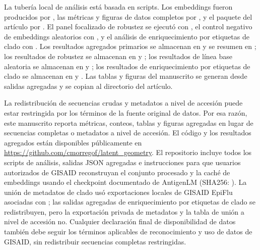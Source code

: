 \documentclass[11pt]{article}
\begin{document}
La tubería local de análisis está basada en scripts. Los embeddings fueron producidos por , las métricas y figuras de datos completos por , y el paquete del artículo por . El panel focalizado de robustez se ejecutó con , el control negativo de embeddings aleatorios con , y el análisis de enriquecimiento por etiquetas de clado con . Los resultados agregados primarios se almacenan en  y se resumen en ; los resultados de robustez se almacenan en  y ; los resultados de línea base aleatoria se almacenan en  y ; los resultados de enriquecimiento por etiquetas de clado se almacenan en  y . Las tablas y figuras del manuscrito se generan desde salidas agregadas y se copian al directorio del artículo.

La redistribución de secuencias crudas y metadatos a nivel de accesión puede estar restringida por los términos de la fuente original de datos. Por esa razón, este manuscrito reporta métricas, conteos, tablas y figuras agregadas en lugar de secuencias completas o metadatos a nivel de accesión. El código y los resultados agregados están disponibles públicamente en \url{https://github.com/cmorregof/latent_geometry}. El repositorio incluye todos los scripts de análisis, salidas JSON agregadas e instrucciones para que usuarios autorizados de GISAID reconstruyan el conjunto procesado y la caché de embeddings usando el checkpoint documentado de AntigenLM (SHA256: ). La unión de metadatos de clado usó exportaciones locales de GISAID EpiFlu asociadas con ; las salidas agregadas de enriquecimiento por etiquetas de clado se redistribuyen, pero la exportación privada de metadatos y la tabla de unión a nivel de accesión no. Cualquier declaración final de disponibilidad de datos también debe seguir los términos aplicables de reconocimiento y uso de datos de GISAID, sin redistribuir secuencias completas restringidas.
\end{document}
